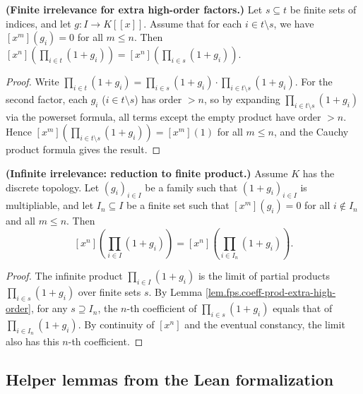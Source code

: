 \begin{lemma}
\label{lem.fps.coeff-prod-extra-high-order}
\leanhelper
\leanok
\textbf{(Finite irrelevance for extra high-order factors.)}
Let $s\subseteq t$ be finite sets of indices, and let $g : I\to K[[x]]$.
Assume that for each $i\in t\setminus s$, we have
$[x^m](g_i) = 0$ for all $m\le n$.
Then $[x^n]\!\left(\prod_{i\in t}(1+g_i)\right) =
[x^n]\!\left(\prod_{i\in s}(1+g_i)\right)$.
\end{lemma}

\begin{proof}
Write $\prod_{i\in t}(1+g_i) = \prod_{i\in s}(1+g_i) \cdot
\prod_{i\in t\setminus s}(1+g_i)$. For the second factor, each $g_i$
($i\in t\setminus s$) has order $>n$, so by expanding
$\prod_{i\in t\setminus s}(1+g_i)$ via the powerset formula, all terms
except the empty product have order $>n$.
Hence $[x^m]\!\left(\prod_{i\in t\setminus s}(1+g_i)\right) =
[x^m](1)$ for all $m\le n$, and the Cauchy product formula gives the result.
\end{proof}

\begin{lemma}
\label{lem.fps.coeff-tprod-one-add-reduce-to-finite}
\leanhelper
\leanok
\textbf{(Infinite irrelevance: reduction to finite product.)}
Assume $K$ has the discrete topology. Let $(g_i)_{i\in I}$ be a family such
that $(1+g_i)_{i\in I}$ is multipliable, and let $I_n\subseteq I$ be a finite
set such that $[x^m](g_i) = 0$ for all $i\notin I_n$ and all $m\le n$.
Then
\[
[x^n]\!\left(\prod_{i\in I}(1+g_i)\right) =
[x^n]\!\left(\prod_{i\in I_n}(1+g_i)\right).
\]
\end{lemma}

\begin{proof}
\leanok
The infinite product $\prod_{i\in I}(1+g_i)$ is the limit of partial products
$\prod_{i\in s}(1+g_i)$ over finite sets $s$.
By Lemma \ref{lem.fps.coeff-prod-extra-high-order}, for any $s\supseteq I_n$,
the $n$-th coefficient of $\prod_{i\in s}(1+g_i)$ equals that of
$\prod_{i\in I_n}(1+g_i)$.
By continuity of $[x^n]$ and the eventual constancy, the limit also has this
$n$-th coefficient.
\end{proof}

\subsection{Helper lemmas from the Lean formalization}


